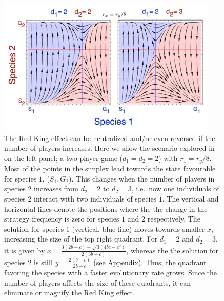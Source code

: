 \documentclass[a4paper]{scrartcl}
\begin{document}
\begin{figure}
\begin{center}
\includegraphics[width=\linewidth]{asymplandrate.eps}
\end{center}
\caption{
The Red King effect can be neutralized and/or even reversed if the number of players increases.
Here we show the scenario explored in \citep{bergstrom:2003jf} on the left panel;
a two player game ($d_1 = d_2 = 2$) with $r_x=r_y/8$.
Most of the points in the simplex lead towards the state favourable for species $1$, ($S_1,G_2$).
This changes when the number of players in species $2$ increases from $d_2=2$ to $d_2=3$,
i.e.\ now one individuals of species 2 interact with two individuals of species $1$. 
The vertical and horizontal lines denote the positions where the the change in the strategy frequency is zero for species $1$ and $2$ respectively.
The solution for species $1$ (vertical, blue line) moves towards smaller $x$, increasing the size of the top right quadrant.
For $d_1=2$ and $d_2=3$, it is given by $x = \frac{3 (2 b-c) - \sqrt{3 (4 b c - c^2)} }{2 (3 b -c)}$, whereas the 
the solution for species $2$ is still $ y = \frac{2(b-c)}{2 b - c}$ (see Appendix).  
Thus, the quadrant favoring the species with a faster evolutionary rate grows.
Since the number of players affects the size of these quadrants, it can eliminate or magnify the Red King effect.
}
\label{fig:counter}
\end{figure}
\end{document}
